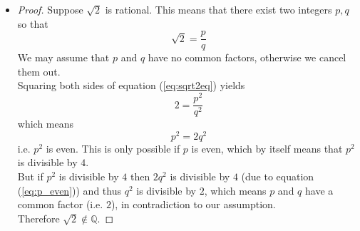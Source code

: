 \begin{enumerate}
{                \begin{itemize}
                  \item[]
                    \begin{answer}
                      \begin{proof}
                        Suppose $\sqrt{2}$ is rational. This means that there exist two integers $p,q$ so that
                        \begin{equation}
                          \label{eq:sqrt2eq}
                          \sqrt{2}=\frac{p}{q}
                        \end{equation}
                        We may assume that $p$ and $q$ have no common factors, otherwise we cancel them out.\\
                        Squaring both sides of equation (\ref{eq:sqrt2eq}) yields
                        \begin{equation}
                          \label{eq:square}
                          2=\frac{p^{2}}{q^{2}}
                        \end{equation}
                        which means
                        \begin{equation}
                          \label{eq:p_even}
                          p^{2}=2q^{2}
                        \end{equation}
                        i.e. $p^{2}$ is even. This is only possible if $p$ is even, which by itself means that $p^2$ is divisible by $4$.\\
                        But if $p^{2}$ is divisible by $4$ then $2q^{2}$ is divisible by $4$ (due to equation (\ref{eq:p_even})) and thus $q^{2}$ is divisible by $2$, which means $p$ and $q$ have a common factor (i.e. $2$), in contradiction to our assumption.\\
                        Therefore $\sqrt{2}\notin\mathbb{Q}$.
                      \end{proof}
                    \end{answer}
                \end{itemize}
              }
            \fi
        \end{enumerate}


